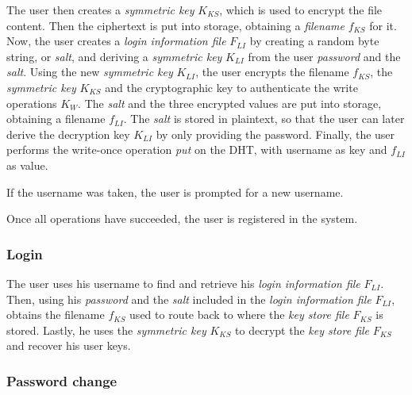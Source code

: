 The user then creates a \textit{symmetric key} $K_{KS}$, which is used to
encrypt the file content. Then the ciphertext
is put into storage, obtaining a \textit{filename} $f_{KS}$ for it. Now, the user
creates a \textit{login information file} $F_{LI}$ by creating a random
byte string, or \textit{salt}, and deriving a \textit{symmetric key} $K_{LI}$ from the user
\textit{password} and the \textit{salt}.
Using the new \textit{ symmetric key} $K_{LI}$, the user encrypts the
filename $f_{KS}$,
the \textit{symmetric key} $K_{KS}$ and the cryptographic key to
authenticate the write operations $K_W$.
 The \textit{salt} and the three encrypted values are put
into storage, obtaining a filename $f_{LI}$. The \textit{salt} is stored
in plaintext, so that the user can later derive the decryption
key $K_{LI}$ by only providing the password. Finally, the user
performs the write-once operation \textit{put} on the DHT, with
username as key and $f_{LI}$ as value.

If the username was taken,
the user is prompted for a new username.

Once all operations
have succeeded, the user is registered in the system.


\subsubsection{Login}


The user uses his username to find and retrieve his \textit{login information
file} $F_{LI}$. Then, using his \textit{password} and the \textit{salt} included in the
\textit{login information file} $F_{LI}$, obtains the filename
$f_{KS}$ used to
route back to where the \textit{key store file} $F_{KS}$ is stored.  Lastly, he uses the
\textit{symmetric key} $K_{KS}$ to decrypt the \textit{key store file}
$F_{KS}$ and recover his user keys.

\subsubsection{Password change}


